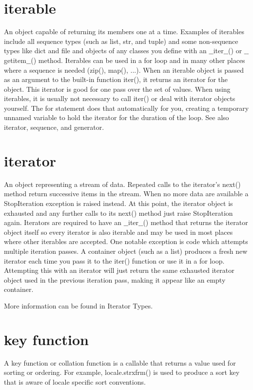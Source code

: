 \documentclass[12pt,a4paper,final,twoside,onecolumn,titlepage]{book}
\begin{document}
\section{iterable}
An object capable of returning its members one at a time. Examples of iterables include all sequence types (such as list, str, and tuple) and some non-sequence types like dict and file and objects of any classes you define with an $\_\_$iter$\_\_$() or $\_\_$getitem$\_\_$() method. Iterables can be used in a for loop and in many other places where a sequence is needed (zip(), map(), ...). When an iterable object is passed as an argument to the built-in function iter(), it returns an iterator for the object. This iterator is good for one pass over the set of values. When using iterables, it is usually not necessary to call iter() or deal with iterator objects yourself. The for statement does that automatically for you, creating a temporary unnamed variable to hold the iterator for the duration of the loop. See also iterator, sequence, and generator.
\section{iterator}
An object representing a stream of data. Repeated calls to the iterator’s next() method return successive items in the stream. When no more data are available a StopIteration exception is raised instead. At this point, the iterator object is exhausted and any further calls to its next() method just raise StopIteration again. Iterators are required to have an $\_\_$iter$\_\_$() method that returns the iterator object itself so every iterator is also iterable and may be used in most places where other iterables are accepted. One notable exception is code which attempts multiple iteration passes. A container object (such as a list) produces a fresh new iterator each time you pass it to the iter() function or use it in a for loop. Attempting this with an iterator will just return the same exhausted iterator object used in the previous iteration pass, making it appear like an empty container.

More information can be found in Iterator Types.

\section{key function}
A key function or collation function is a callable that returns a value used for sorting or ordering. For example, locale.strxfrm() is used to produce a sort key that is aware of locale specific sort conventions.
\end{document}

